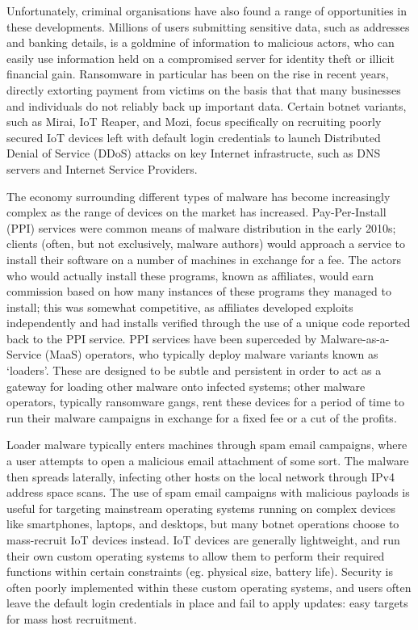 \documentclass[10pt,sigconf]{acmart}
\begin{document}
Unfortunately, criminal organisations have also found a range of opportunities in these developments.
Millions of users submitting sensitive data, such as addresses and banking details, is a goldmine of information to malicious actors, who can easily use information held on a compromised server for identity theft or illicit financial gain.
Ransomware in particular has been on the rise in recent years, directly extorting payment from victims on the basis that that many businesses and individuals do not reliably back up important data.
Certain botnet variants, such as Mirai, IoT Reaper, and Mozi, focus specifically on recruiting poorly secured IoT devices left with default login credentials to launch Distributed Denial of Service (DDoS) attacks on key Internet infrastructe, such as DNS servers and Internet Service Providers.

The economy surrounding different types of malware has become increasingly complex as the range of devices on the market has increased.
Pay-Per-Install (PPI) services were common means of malware distribution in the early 2010s;
clients (often, but not exclusively, malware authors) would approach a service to install their software on a number of machines in exchange for a fee.
The actors who would actually install these programs, known as affiliates, would earn commission based on how many instances of these programs they managed to install;
this was somewhat competitive, as affiliates developed exploits independently and had installs verified through the use of a unique code reported back to the PPI service.
PPI services have been superceded by Malware-as-a-Service (MaaS) operators, who typically deploy malware variants known as `loaders'.
These are designed to be subtle and persistent in order to act as a gateway for loading other malware onto infected systems;
other malware operators, typically ransomware gangs, rent these devices for a period of time to run their malware campaigns in exchange for a fixed fee or a cut of the profits.

Loader malware typically enters machines through spam email campaigns, where a user attempts to open a malicious email attachment of some sort.
The malware then spreads laterally, infecting other hosts on the local network through IPv4 address space scans.
The use of spam email campaigns with malicious payloads is useful for targeting mainstream operating systems running on complex devices like smartphones, laptops, and desktops, but many botnet operations choose to mass-recruit IoT devices instead.
IoT devices are generally lightweight, and run their own custom operating systems to allow them to perform their required functions within certain constraints (eg. physical size, battery life).
Security is often poorly implemented within these custom operating systems, and users often leave the default login credentials in place and fail to apply updates:
easy targets for mass host recruitment.
\end{document}
